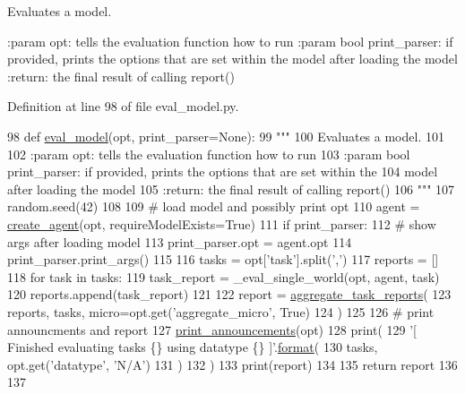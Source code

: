 \begin{DoxyVerb}Evaluates a model.

:param opt: tells the evaluation function how to run
:param bool print_parser: if provided, prints the options that are set within the
    model after loading the model
:return: the final result of calling report()
\end{DoxyVerb}
 

Definition at line 98 of file eval\+\_\+model.\+py.


\begin{DoxyCode}
98 \textcolor{keyword}{def }\hyperlink{namespaceparlai_1_1scripts_1_1eval__model_ade1dfda1be70776553a1fbd6a3450c40}{eval\_model}(opt, print\_parser=None):
99     \textcolor{stringliteral}{"""}
100 \textcolor{stringliteral}{    Evaluates a model.}
101 \textcolor{stringliteral}{}
102 \textcolor{stringliteral}{    :param opt: tells the evaluation function how to run}
103 \textcolor{stringliteral}{    :param bool print\_parser: if provided, prints the options that are set within the}
104 \textcolor{stringliteral}{        model after loading the model}
105 \textcolor{stringliteral}{    :return: the final result of calling report()}
106 \textcolor{stringliteral}{    """}
107     random.seed(42)
108 
109     \textcolor{comment}{# load model and possibly print opt}
110     agent = \hyperlink{namespaceparlai_1_1core_1_1agents_ad0d54074d4bcc148bb415ab5515a53b5}{create\_agent}(opt, requireModelExists=\textcolor{keyword}{True})
111     \textcolor{keywordflow}{if} print\_parser:
112         \textcolor{comment}{# show args after loading model}
113         print\_parser.opt = agent.opt
114         print\_parser.print\_args()
115 
116     tasks = opt[\textcolor{stringliteral}{'task'}].split(\textcolor{stringliteral}{','})
117     reports = []
118     \textcolor{keywordflow}{for} task \textcolor{keywordflow}{in} tasks:
119         task\_report = \_eval\_single\_world(opt, agent, task)
120         reports.append(task\_report)
121 
122     report = \hyperlink{namespaceparlai_1_1core_1_1metrics_ae323045c05ed03d93c260521ebb8bf71}{aggregate\_task\_reports}(
123         reports, tasks, micro=opt.get(\textcolor{stringliteral}{'aggregate\_micro'}, \textcolor{keyword}{True})
124     )
125 
126     \textcolor{comment}{# print announcments and report}
127     \hyperlink{namespaceparlai_1_1core_1_1params_afd1a47c94990168ea9e70d894a79bd2c}{print\_announcements}(opt)
128     print(
129         \textcolor{stringliteral}{'[ Finished evaluating tasks \{\} using datatype \{\} ]'}.\hyperlink{namespaceparlai_1_1chat__service_1_1services_1_1messenger_1_1shared__utils_a32e2e2022b824fbaf80c747160b52a76}{format}(
130             tasks, opt.get(\textcolor{stringliteral}{'datatype'}, \textcolor{stringliteral}{'N/A'})
131         )
132     )
133     print(report)
134 
135     \textcolor{keywordflow}{return} report
136 
137 
\end{DoxyCode}
\mbox{\label{namespaceparlai_1_1scripts_1_1eval__model_a2eaba0aa76c4d83e2a0f7f77c23479c8}} 
